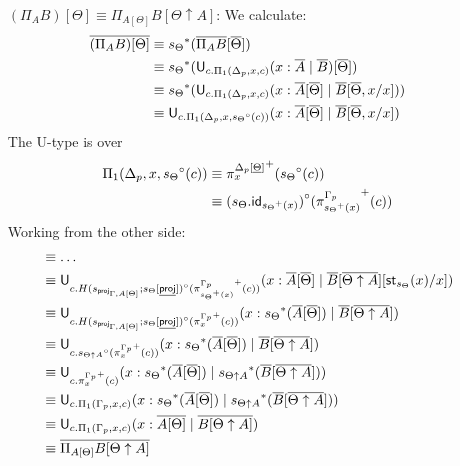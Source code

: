 \documentclass[10pt]{article}
\theoremstyle{definition}
\newcommand\U[3]{\ensuremath{\mathsf{U}_{#1}(#2 \mid #3)}}
\newcommand\St[2]{\ensuremath{{#1}^*(#2)}}
\newcommand\StI[2]{\ensuremath{\mathsf{st}_{#1}(#2)}}
\newcommand\TrPlus[2]{\ensuremath{{#1}^+(#2)}}
\newcommand\TrCirc[2]{\ensuremath{{#1}^\circ(#2)}}
\newcommand\proj[1]{\ensuremath{\mathsf{proj}_{#1}}}
\newcommand{\id}{\mathsf{id}}
\begin{document}
\begin{enumerate}[style = multiline, labelwidth = 80pt]
\item[{$(\Pi_A B)[\Theta] \equiv \Pi_{A[\Theta]} B[\Theta \uparrow A] $}:] We calculate:
\begin{align*}
\upstairs{(\Pi_A B)[\Theta]} 
&\equiv \St{s_{\Theta}}{\upstairs{\Pi_A B}[\upstairs{\Theta}]} \\
&\equiv \St{s_{\Theta}}{\U{c.\Pi_1(\asdep{\Delta},x,c)}{x : \upstairs{A}}{\upstairs{B}}[\upstairs{\Theta}]} \\
&\equiv \St{s_{\Theta}}{\U{c.\Pi_1(\asdep{\Delta},x,c)}{x : \upstairs{A}[\upstairs{\Theta}]}{\upstairs{B}[\upstairs{\Theta}, x/x]}} \\
&\equiv \U{c.\Pi_1(\asdep{\Delta},x,\TrCirc{s_{\Theta}}{c})}{x : \upstairs{A}[\upstairs{\Theta}]}{\upstairs{B}[\upstairs{\Theta},x/x]}
\end{align*}
The U-type is over 
\begin{align*}
\Pi_1(\asdep{\Delta},x,\TrCirc{s_{\Theta}}{c})
&\equiv \TrPlus{\pi^{\asdep{\Delta}[\downstairs{\Theta}]}_x}{\TrCirc{s_{\Theta}}{c}} \\
&\equiv \TrCirc{(s_{\Theta} . \id_{\TrPlus{s_\Theta}{x}})}{\TrPlus{\pi^{\asdep{\Gamma}}_{\TrPlus{s_\Theta}{x}}}{c}}
\end{align*}
Working from the other side:
\begin{align*}
&\equiv \dots \\ 
&\equiv \U{c.\TrCirc{H(s_{\proj{\Gamma, A[\Theta]}} ; s_{\Theta}[\downstairs{\mathsf{proj}}])}{\TrPlus{\pi^{\asdep{\Gamma}}_{\TrPlus{s_\Theta}{x}}}{c}}}{x : \upstairs{A}[\upstairs{\Theta}]}{\upstairs{B}[\upstairs{\Theta \uparrow A}][\StI{s_\Theta}{x}/x]} \\
&\equiv \U{c.\TrCirc{H(s_{\proj{\Gamma, A[\Theta]}} ; s_{\Theta}[\downstairs{\mathsf{proj}}])}{\TrPlus{\pi^{\asdep{\Gamma}}_x}{c}}}{x : \St{s_\Theta}{\upstairs{A}[\upstairs{\Theta}]}}{\upstairs{B}[\upstairs{\Theta \uparrow A}]} \\
&\equiv \U{c.\TrCirc{s_{\Theta \uparrow A}}{\TrPlus{\pi^{\asdep{\Gamma}}_x}{c}}}{x : \St{s_\Theta}{\upstairs{A}[\upstairs{\Theta}]}}{\upstairs{B}[\upstairs{\Theta \uparrow A}]} \\
&\equiv \U{c.\TrPlus{\pi^{\asdep{\Gamma}}_x}{c}}{x : \St{s_\Theta}{\upstairs{A}[\upstairs{\Theta}]}}{\St{s_{\Theta \uparrow A}}{\upstairs{B}[\upstairs{\Theta \uparrow A}]}} \\
&\equiv \U{c.\Pi_1(\asdep{\Gamma},x,c)}{x : \St{s_\Theta}{\upstairs{A}[\upstairs{\Theta}]}}{\St{s_{\Theta \uparrow A}}{\upstairs{B}[\upstairs{\Theta \uparrow A}]}} \\
&\equiv \U{c.\Pi_1(\asdep{\Gamma},x,c)}{x : \upstairs{A[\Theta]}}{\upstairs{B[\Theta \uparrow A]}} \\
&\equiv \upstairs{\Pi_{A[\Theta]} B[\Theta \uparrow A]}
\end{align*}

\end{enumerate}
\end{document}
